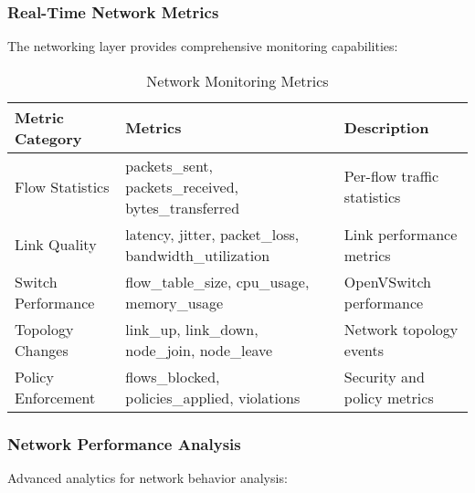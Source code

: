 \subsubsection{Real-Time Network Metrics}

The networking layer provides comprehensive monitoring capabilities:

\begin{table}[H]
\centering
\caption{Network Monitoring Metrics}
\label{tab:network-metrics}
\begin{tabular}{llp{5cm}}
\toprule
\textbf{Metric Category} & \textbf{Metrics} & \textbf{Description} \\
\midrule
Flow Statistics & packets\_sent, packets\_received, bytes\_transferred & Per-flow traffic statistics \\
Link Quality & latency, jitter, packet\_loss, bandwidth\_utilization & Link performance metrics \\
Switch Performance & flow\_table\_size, cpu\_usage, memory\_usage & OpenVSwitch performance \\
Topology Changes & link\_up, link\_down, node\_join, node\_leave & Network topology events \\
Policy Enforcement & flows\_blocked, policies\_applied, violations & Security and policy metrics \\
\bottomrule
\end{tabular}
\end{table}

\subsubsection{Network Performance Analysis}

Advanced analytics for network behavior analysis:

